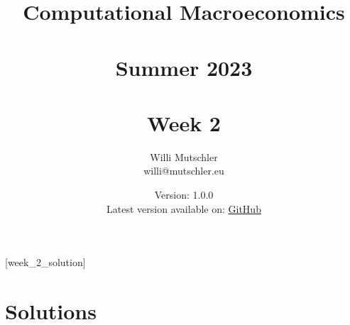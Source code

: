
\newif\ifDisplaySolutions\DisplaySolutionstrue


\title{Computational Macroeconomics\\~\\Summer 2023\\~\\Week 2}
\author{Willi Mutschler\\willi@mutschler.eu}
\date{Version: 1.0.0\\Latest version available on: \href{https://github.com/wmutschl/Computational-Macroeconomics/releases/latest/download/week_2.pdf}{GitHub}}
\maketitle\thispagestyle{empty}

\newpage
{}[week_2_solution]
\tableofcontents\thispagestyle{empty}\newpage

\setcounter{page}{1}
\newpage
\newpage
\newpage
\printbibliography
\newpage

\ifDisplaySolutions
\newpage
\appendix
\section{Solutions}

\fi
